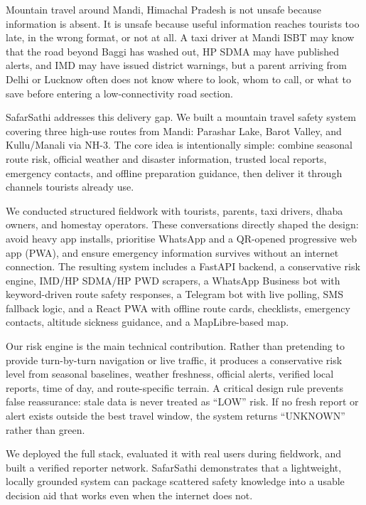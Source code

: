 \documentclass[12pt,a4paper]{article}
\begin{document}
Mountain travel around Mandi, Himachal Pradesh is not unsafe because information is absent. It is unsafe because useful information reaches tourists too late, in the wrong format, or not at all. A taxi driver at Mandi ISBT may know that the road beyond Baggi has washed out, HP SDMA may have published alerts, and IMD may have issued district warnings, but a parent arriving from Delhi or Lucknow often does not know where to look, whom to call, or what to save before entering a low-connectivity road section.

SafarSathi addresses this delivery gap. We built a mountain travel safety system covering three high-use routes from Mandi: Parashar Lake, Barot Valley, and Kullu/Manali via NH-3. The core idea is intentionally simple: combine seasonal route risk, official weather and disaster information, trusted local reports, emergency contacts, and offline preparation guidance, then deliver it through channels tourists already use.

We conducted structured fieldwork with tourists, parents, taxi drivers, dhaba owners, and homestay operators. These conversations directly shaped the design: avoid heavy app installs, prioritise WhatsApp and a QR-opened progressive web app (PWA), and ensure emergency information survives without an internet connection. The resulting system includes a FastAPI backend, a conservative risk engine, IMD/HP SDMA/HP PWD scrapers, a WhatsApp Business bot with keyword-driven route safety responses, a Telegram bot with live polling, SMS fallback logic, and a React PWA with offline route cards, checklists, emergency contacts, altitude sickness guidance, and a MapLibre-based map.

Our risk engine is the main technical contribution. Rather than pretending to provide turn-by-turn navigation or live traffic, it produces a conservative risk level from seasonal baselines, weather freshness, official alerts, verified local reports, time of day, and route-specific terrain. A critical design rule prevents false reassurance: stale data is never treated as ``LOW'' risk. If no fresh report or alert exists outside the best travel window, the system returns ``UNKNOWN'' rather than green.

We deployed the full stack, evaluated it with real users during fieldwork, and built a verified reporter network. SafarSathi demonstrates that a lightweight, locally grounded system can package scattered safety knowledge into a usable decision aid that works even when the internet does not.
\end{document}
